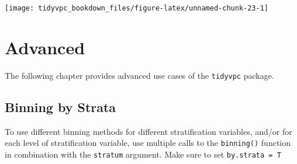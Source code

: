 \documentclass[
]{book}
\begin{document}
\texttt{[image: tidyvpc\_bookdown\_files/figure-latex/unnamed-chunk-23-1]}

\hypertarget{advanced}{%
\chapter{Advanced}\label{advanced}}

The following chapter provides advanced use cases of the \texttt{tidyvpc} package.

\hypertarget{binning-by-strata}{%
\section{Binning by Strata}\label{binning-by-strata}}

To use different binning methods for different stratification variables, and/or for each level of stratification variable, use multiple calls to the \texttt{binning()} function in combination with the \texttt{stratum} argument. Make sure to set \texttt{by.strata\ =\ T}
\end{document}
